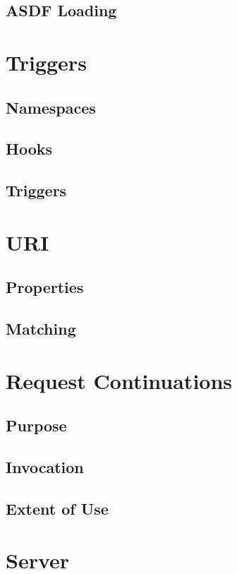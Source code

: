 \subsection{ASDF Loading}\label{sec:int asdf loading}
\newpage
\section{Triggers}\label{sec:triggers}
\subsection{Namespaces}\label{sec:trig namespaces}
\subsection{Hooks}\label{sec:trig hooks}
\subsection{Triggers}\label{sec:trig triggers}
\newpage
\section{URI}\label{sec:uri}
\subsection{Properties}\label{sec:uri properties}
\subsection{Matching}\label{sec:uri matching}
\newpage
\section{Request Continuations}\label{sec:request continuations}
\subsection{Purpose}\label{sec:req purpose}
\subsection{Invocation}\label{sec:req invocation}
\subsection{Extent of Use}\label{sec:req extent of use}
\newpage
\section{Server}\label{sec:server}
